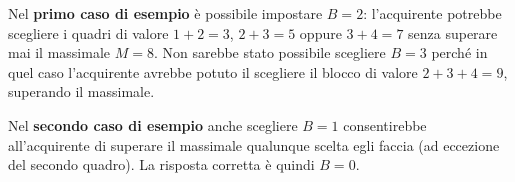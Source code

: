 \pagebreak

\Examples
\begin{example}
%
%
\end{example}

\Explanation

Nel \textbf{primo caso di esempio} è possibile impostare $B=2$: l'acquirente potrebbe scegliere i quadri di valore $1+2=3$, $2+3=5$ oppure $3+4=7$ senza superare mai il massimale $M=8$. Non sarebbe stato possibile scegliere $B=3$ perché in quel caso l'acquirente avrebbe potuto il scegliere il blocco di valore $2+3+4=9$, superando il massimale.

Nel \textbf{secondo caso di esempio} anche scegliere $B=1$ consentirebbe all'acquirente di superare il massimale qualunque scelta egli faccia (ad eccezione del secondo quadro). La risposta corretta è quindi $B=0$.


